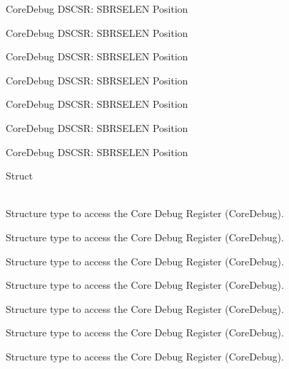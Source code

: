 \begin{DoxyRefList}
\label{deprecated__deprecated000151}%
%
Core\+Debug DSCSR\+: SBRSELEN Position 

\label{deprecated__deprecated000227}%
%
Core\+Debug DSCSR\+: SBRSELEN Position 

\label{deprecated__deprecated000290}%
%
Core\+Debug DSCSR\+: SBRSELEN Position 

\label{deprecated__deprecated000369}%
%
Core\+Debug DSCSR\+: SBRSELEN Position 

\label{deprecated__deprecated000445}%
%
Core\+Debug DSCSR\+: SBRSELEN Position 

\label{deprecated__deprecated000548}%
%
Core\+Debug DSCSR\+: SBRSELEN Position 

\label{deprecated__deprecated000650}%
%
Core\+Debug DSCSR\+: SBRSELEN Position  
\item[{\parbox[t]{\linewidth}{Struct \doxylink{struct_core_debug___type}{Core\+Debug\+\_\+\+Type} }}]\hfill \\
\label{deprecated__deprecated000004}%
%
Structure type to access the Core Debug Register (Core\+Debug). 

\label{deprecated__deprecated000104}%
%
Structure type to access the Core Debug Register (Core\+Debug). 

\label{deprecated__deprecated000158}%
%
Structure type to access the Core Debug Register (Core\+Debug). 

\label{deprecated__deprecated000243}%
%
Structure type to access the Core Debug Register (Core\+Debug). 

\label{deprecated__deprecated000300}%
%
Structure type to access the Core Debug Register (Core\+Debug). 

\label{deprecated__deprecated000376}%
%
Structure type to access the Core Debug Register (Core\+Debug). 

\label{deprecated__deprecated000455}%
%
Structure type to access the Core Debug Register (Core\+Debug). 


\end{DoxyRefList}
